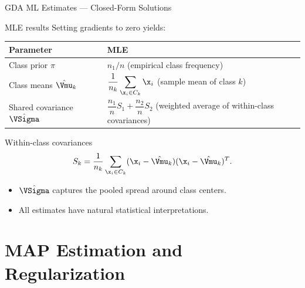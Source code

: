 \begin{frame}{GDA ML Estimates — Closed-Form Solutions}
  \begin{block}{MLE results}
    Setting gradients to zero yields:

    \medskip
    \begin{tabular}{ll}
      \toprule
      \textbf{Parameter} & \textbf{MLE} \\
      \midrule
      Class prior $\hat\pi$ & $n_1/n$ \quad (empirical class frequency)\\[4pt]
      Class means $\hat\Vmu_k$ & $\dfrac{1}{n_k}\displaystyle\sum_{\x_i\in C_k}\x_i$
                                  \quad (sample mean of class $k$)\\[8pt]
      Shared covariance $\hat\VSigma$ & $\dfrac{n_1}{n}S_1+\dfrac{n_2}{n}S_2$
                                         \quad (weighted average of within-class covariances)\\
      \bottomrule
    \end{tabular}
  \end{block}

  \begin{block}{Within-class covariances}
    \[
      S_k=\frac{1}{n_k}\sum_{\x_i\in C_k}(\x_i-\hat\Vmu_k)(\x_i-\hat\Vmu_k)^T.
    \]
    \begin{itemize}
      \item $\hat\VSigma$ captures the pooled spread around class centers.
      \item All estimates have natural statistical interpretations.
    \end{itemize}
  \end{block}
\end{frame}

\section{MAP Estimation and Regularization}

